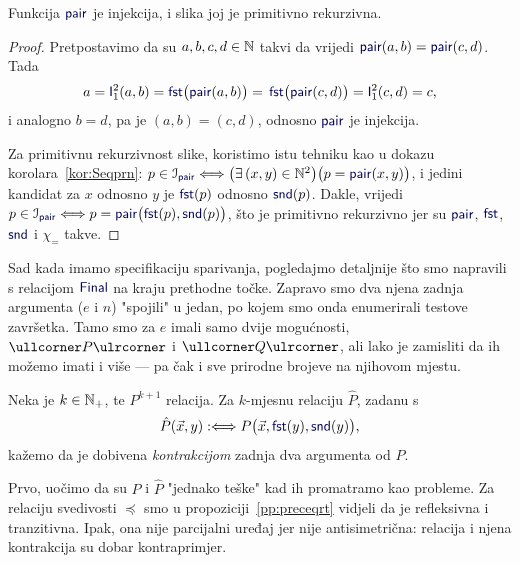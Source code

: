 \begin{propozicija}[{name=[injektivnost i primitivna rekurzivnost slike funkcije sparivanja]}]
Funkcija $\f{pair}$ je injekcija, i slika joj je primitivno rekurzivna.
\end{propozicija}
\begin{proof}
Pretpostavimo da su $a,b,c,d\in{\mathbb N}$ takvi da vrijedi $\f{pair}(a,b)=\f{pair}(c,d)$. Tada
\begin{equation}
    a=\f I_1^2(a,b)=\f{fst}\bigl(\f{pair}(a,b)\bigr)=\,
    \f{fst}\bigl(\f{pair}(c,d)\bigr)=\f I_1^2(c,d)=c\text,
\end{equation}
i analogno $b=d$, pa je $(a,b)=(c,d)$, odnosno $\f{pair}$ je injekcija.

Za primitivnu rekurzivnost slike, koristimo istu tehniku kao u dokazu korolara~\ref{kor:Seqprn}: $p\in\im{\f{pair}}\Longleftrightarrow\bigl(\exists\,(x,y)\in\N^2\bigr)\bigl(p=\f{pair}(x,y)\bigr)$, i jedini kandidat za $x$ odnosno $y$ je $\f{fst}(p)$ odnosno $\f{snd}(p)$. Dakle, vrijedi
    $p\in\im{\f{pair}}\Longleftrightarrow p=\f{pair}\bigl(\f{fst}(p),\f{snd}(p)\bigr)$,
što je primitivno rekurzivno jer su $\f{pair}$, $\f{fst}$, $\f{snd}$ i $\chi_=$ takve.
\end{proof}

Sad kada imamo specifikaciju sparivanja, pogledajmo detaljnije što smo napravili s relacijom $\f{Final}$ na kraju prethodne točke. Zapravo smo dva njena zadnja argumenta ($e$ i $n$) "spojili" u jedan, po kojem smo onda enumerirali testove završetka. Tamo smo za $e$ imali samo dvije mogućnosti, $\kprog P$ i $\kprog Q$, ali lako je zamisliti da ih možemo imati i više --- pa čak i sve prirodne brojeve na njihovom mjestu.

\begin{definicija}[{name=[kontrakcija brojevne relacije]}]
Neka je $k\in{\mathbb N}_+$, te $P^{k+1}$ relacija. Za $k$-mjesnu relaciju $\hat P$, zadanu s
\begin{equation}
    \hat P(\vec x,y):\Longleftrightarrow P\bigl(\vec x,\f{fst}(y),\f{snd}(y)\bigr)\text,
\end{equation}
kažemo da je dobivena \emph{kontrakcijom} zadnja dva argumenta od $P$.
\end{definicija}

Prvo, uočimo da su $P$ i $\hat P$ "jednako teške" kad ih promatramo kao probleme. Za relaciju svedivosti $\preceq$ smo u propoziciji~\ref{pp:preceqrt} vidjeli da je refleksivna i tranzitivna. Ipak, ona nije parcijalni uređaj jer nije antisimetrična: relacija i njena kontrakcija su dobar kontraprimjer.

